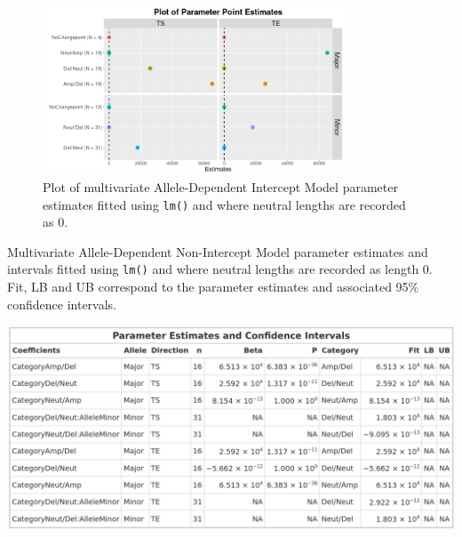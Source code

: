 \begin{figure}[!h]
\centering
\includegraphics[width = 0.8\textwidth]{../figures/Chapter_5/Multivariate_lm_7_AD_Interval.png}
 
\caption[Plot of multivariate Allele-Dependent Intercept Model parameter estimates fitted using \texttt{lm()}.]{Plot of multivariate Allele-Dependent Intercept Model parameter estimates fitted using \texttt{lm()} and where neutral lengths are recorded as 0.}
\label{fig:lm_multi_AD_modpred}
\end{figure}

\begin{table}[!h]
\centering
\caption[Multivariate Allele-Dependent Non-Intercept Model parameter estimates and intervals fitted using \texttt{lm()}.]{Multivariate Allele-Dependent Non-Intercept Model parameter estimates and intervals fitted using \texttt{lm()} and where neutral lengths are recorded as length 0. Fit, LB and UB correspond to the parameter estimates and associated 95\% confidence intervals.}

\includegraphics[width = 1\textwidth]{../tables/Chapter_5/Multivariate_lm_6_AD_Model_Pred.png}
\label{tab:lm_multi_AD_modpred_6}
\end{table}
\clearpage

